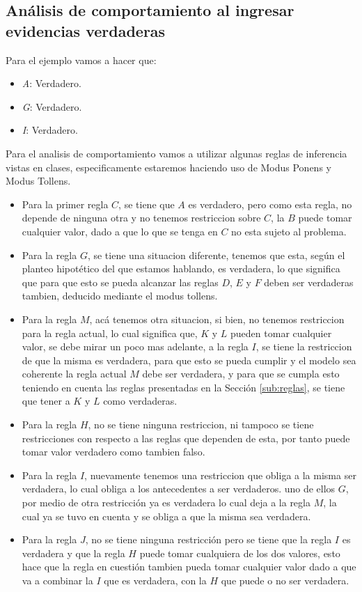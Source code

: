\documentclass{article}
\begin{document}
\subsection{Análisis de comportamiento al ingresar evidencias verdaderas}
Para el ejemplo vamos a hacer que:

\begin{itemize}
	\item \textit{A}: Verdadero.
	\item \textit{G}: Verdadero.
	\item \textit{I}: Verdadero.
\end{itemize}

Para el analisis de comportamiento vamos a utilizar algunas reglas de
inferencia vistas en clases, especificamente estaremos haciendo uso de Modus
Ponens y Modus Tollens.

\begin{itemize}
	\item Para la primer regla $C$, se tiene que $A$ es verdadero, pero como esta
		regla, no depende de ninguna otra y no tenemos restriccion sobre $C$, la
		$B$ puede tomar cualquier valor, dado a que lo que se tenga en $C$ no esta
		sujeto al problema.
	\item Para la regla $G$, se tiene una situacion diferente, tenemos que esta,
		según el planteo hipotético del que estamos hablando, es verdadera, lo que
		significa que para que esto se pueda alcanzar las reglas $D$, $E$ y $F$
		deben ser verdaderas tambien, deducido mediante el modus tollens.
	\item Para la regla $M$, acá tenemos otra situacion, si bien, no tenemos
		restriccion para la regla actual, lo cual significa que, $K$ y $L$ pueden
		tomar cualquier valor, se debe mirar un poco mas adelante, a la regla $I$,
		se tiene la restriccion de que la misma es verdadera, para que esto se
		pueda cumplir y el modelo sea coherente la regla actual $M$ debe ser
		verdadera, y para que se cumpla esto teniendo en cuenta las reglas
		presentadas en la Sección \ref{sub:reglas}, se tiene que tener a $K$ y $L$
		como verdaderas.
	\item Para la regla $H$, no se tiene ninguna restriccion, ni tampoco se tiene
		restricciones con respecto a las reglas que dependen de esta, por tanto
		puede tomar valor verdadero como tambien falso.
	\item Para la regla $I$, nuevamente tenemos una restriccion que obliga a la
		misma ser verdadera, lo cual obliga a los antecedentes a ser verdaderos.
		uno de ellos $G$, por medio de otra restricción ya es verdadera lo cual
		deja a la regla $M$, la cual ya se tuvo en cuenta y se obliga a que la
		misma sea verdadera.
	\item Para la regla $J$, no se tiene ninguna restricción pero se tiene que la
		regla $I$ es verdadera y que la regla $H$ puede tomar cualquiera de los dos
		valores, esto hace que la regla en cuestión tambien pueda tomar cualquier
		valor dado a que va a combinar la $I$ que es verdadera, con la $H$ que
		puede o no ser verdadera.
\end{itemize}
\end{document}
